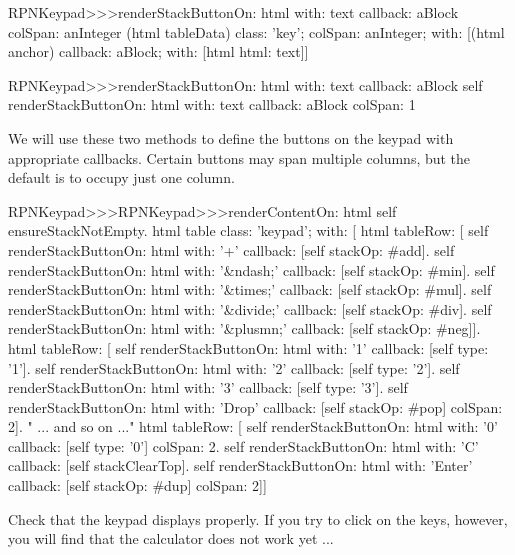 \documentclass[a4paper,10pt,twoside]{book}
\begin{document}
\begin{code}{}
RPNKeypad>>>renderStackButtonOn: html with: text callback: aBlock colSpan: anInteger 
	(html tableData)
		class: 'key';
		colSpan: anInteger;
		with: 
				[(html anchor)
					callback: aBlock;
					with: [html html: text]]
\end{code}


\begin{code}{}
RPNKeypad>>>renderStackButtonOn: html with: text callback: aBlock 
	self 
		renderStackButtonOn: html
		with: text
		callback: aBlock
		colSpan: 1
\end{code}

We will use these two methods to define the buttons on the keypad with appropriate callbacks.
Certain buttons may span multiple columns, but the default is to occupy just one column.



\begin{code}{}
RPNKeypad>>>RPNKeypad>>>renderContentOn: html 
  self ensureStackNotEmpty.
  html table
    class: 'keypad';
    with: [
      html tableRow: [
        self renderStackButtonOn: html with: '+' callback: [self stackOp: #add].
        self renderStackButtonOn: html with: '&ndash;' callback: [self stackOp: #min].
        self renderStackButtonOn: html with: '&times;' callback: [self stackOp: #mul].
        self renderStackButtonOn: html with: '&divide;' callback: [self stackOp: #div].
        self renderStackButtonOn: html with: '&plusmn;' callback: [self stackOp: #neg]].
      html tableRow: [
        self renderStackButtonOn: html with: '1' callback: [self type: '1'].
        self renderStackButtonOn: html with: '2' callback: [self type: '2'].
        self renderStackButtonOn: html with: '3' callback: [self type: '3'].
        self renderStackButtonOn: html with: 'Drop' callback: [self stackOp: #pop]
              colSpan: 2].
" ... and so on ..."
      html tableRow: [
        self renderStackButtonOn: html with: '0' callback: [self type: '0']
              colSpan: 2.
        self renderStackButtonOn: html with: 'C' callback: [self stackClearTop].
        self renderStackButtonOn: html with: 'Enter' callback: [self stackOp: #dup]
              colSpan: 2]]

\end{code}

Check that the keypad displays properly.
If you try to click on the keys, however, you will find that the calculator does not work yet ...
\end{document}
